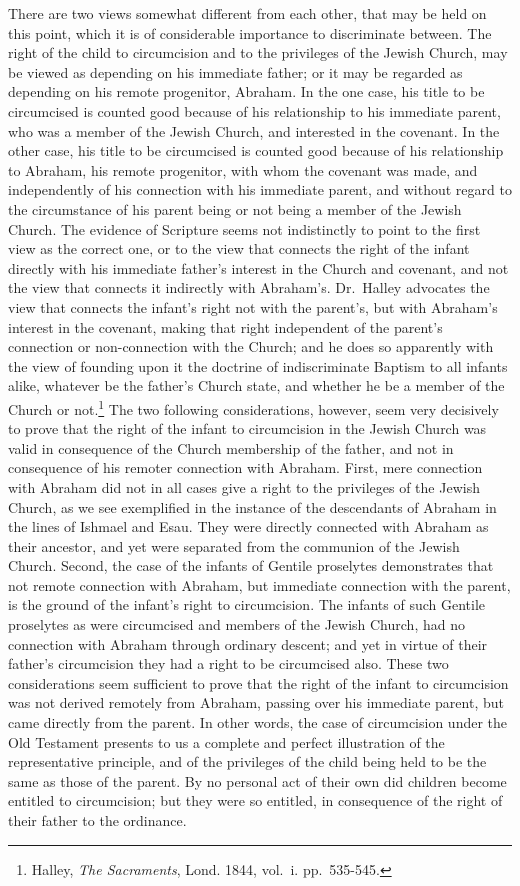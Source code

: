 \documentclass[]{book}
\begin{document}
There are two views somewhat different from each other, that may be held on this point, which it is of considerable importance to discriminate between. The right of the child to circumcision and to the privileges of the Jewish Church, may be viewed as depending on his immediate father; or it may be regarded as depending on his remote progenitor, Abraham. In the one case, his title to be circumcised is counted good because of his relationship to his immediate parent, who was a member of the Jewish Church, and interested in the covenant. In the other case, his title to be circumcised is counted good because of his relationship to Abraham, his remote progenitor, with whom the covenant was made, and independently of his connection with his immediate parent, and without regard to the circumstance of his parent being or not being a member of the Jewish Church. The evidence of Scripture seems not indistinctly to point to the first view as the correct one, or to the view that connects the right of the infant directly with his immediate father's interest in the Church and covenant, and not the view that connects it indirectly with Abraham's. Dr.~Halley advocates the view that connects the infant's right not with the parent's, but with Abraham's interest in the covenant, making that right independent of the parent's connection or non-connection with the Church; and he does so apparently with the view of founding upon it the doctrine of indiscriminate Baptism to all infants alike, whatever be the father's Church state, and whether he be a member of the Church or not.\footnote{Halley, \emph{The Sacraments}, Lond. 1844, vol.~i. pp.~535-545.} The two following considerations, however, seem very decisively to prove that the right of the infant to circumcision in the Jewish Church was valid in consequence of the Church membership of the father, and not in consequence of his remoter connection with Abraham. First, mere connection with Abraham did not in all cases give a right to the privileges of the Jewish Church, as we see exemplified in the instance of the descendants of Abraham in the lines of Ishmael and Esau. They were directly connected with Abraham as their ancestor, and yet were separated from the communion of the Jewish Church. Second, the case of the infants of Gentile proselytes demonstrates that not remote connection with Abraham, but immediate connection with the parent, is the ground of the infant's right to circumcision. The infants of such Gentile proselytes as were circumcised and members of the Jewish Church, had no connection with Abraham through ordinary descent; and yet in virtue of their father's circumcision they had a right to be circumcised also. These two considerations seem sufficient to prove that the right of the infant to circumcision was not derived remotely from Abraham, passing over his immediate parent, but came directly from the parent. In other words, the case of circumcision under the Old Testament presents to us a complete and perfect illustration of the representative principle, and of the privileges of the child being held to be the same as those of the parent. By no personal act of their own did children become entitled to circumcision; but they were so entitled, in consequence of the right of their father to the ordinance.
\end{document}
